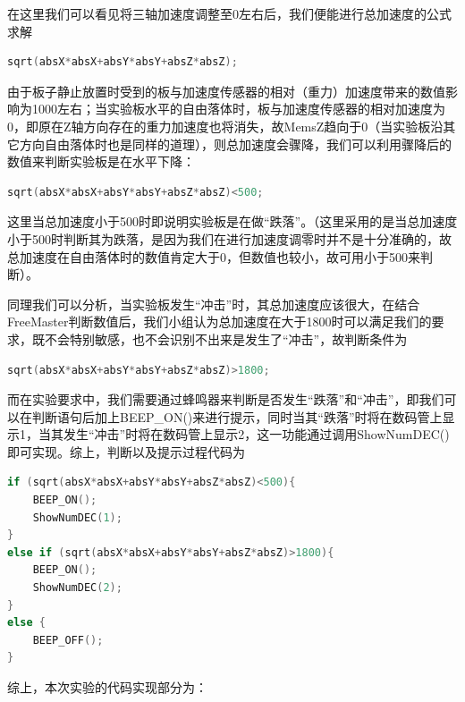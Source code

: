 \par{在这里我们可以看见将三轴加速度调整至0左右后，我们便能进行总加速度的公式求解}

\begin{lstlisting}[language = C++]
sqrt(absX*absX+absY*absY+absZ*absZ);
\end{lstlisting}

\par{由于板子静止放置时受到的板与加速度传感器的相对（重力）加速度带来的数值影响为1000左右；当实验板水平的自由落体时，板与加速度传感器的相对加速度为0，即原在Z轴方向存在的重力加速度也将消失，故MemsZ趋向于0（当实验板沿其它方向自由落体时也是同样的道理），则总加速度会骤降，我们可以利用骤降后的数值来判断实验板是在水平下降：}

\begin{lstlisting}[language = C++]
sqrt(absX*absX+absY*absY+absZ*absZ)<500;
\end{lstlisting}

\par{这里当总加速度小于500时即说明实验板是在做“跌落”。（这里采用的是当总加速度小于500时判断其为跌落，是因为我们在进行加速度调零时并不是十分准确的，故总加速度在自由落体时的数值肯定大于0，但数值也较小，故可用小于500来判断）。}
\par{同理我们可以分析，当实验板发生“冲击”时，其总加速度应该很大，在结合FreeMaster判断数值后，我们小组认为总加速度在大于1800时可以满足我们的要求，既不会特别敏感，也不会识别不出来是发生了“冲击”，故判断条件为}

\begin{lstlisting}[language = C++]
sqrt(absX*absX+absY*absY+absZ*absZ)>1800;
\end{lstlisting}

\par{而在实验要求中，我们需要通过蜂鸣器来判断是否发生“跌落”和“冲击”，即我们可以在判断语句后加上BEEP\_ON()来进行提示，同时当其“跌落”时将在数码管上显示1，当其发生“冲击”时将在数码管上显示2，这一功能通过调用ShowNumDEC()即可实现。综上，判断以及提示过程代码为}

\begin{lstlisting}[language = C++]
if (sqrt(absX*absX+absY*absY+absZ*absZ)<500){
    BEEP_ON();
    ShowNumDEC(1);
}
else if (sqrt(absX*absX+absY*absY+absZ*absZ)>1800){
    BEEP_ON();
    ShowNumDEC(2);
}
else {
	BEEP_OFF();
}

\end{lstlisting}

\par{综上，本次实验的代码实现部分为：}

